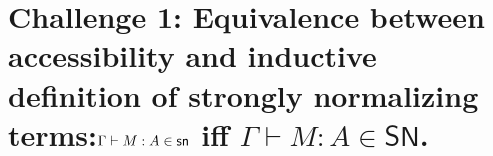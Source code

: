 \documentclass{beamer}
\newcommand{\SN}{\mathsf{SN}}
\begin{document}
\section{Challenge 1: Equivalence between accessibility and inductive
  definition of strongly normalizing terms:\newline \newline $\Gamma \vdash M : A \in \mathsf{sn}$ iff $\Gamma \vdash M : A \in \SN$.}



\end{document}
